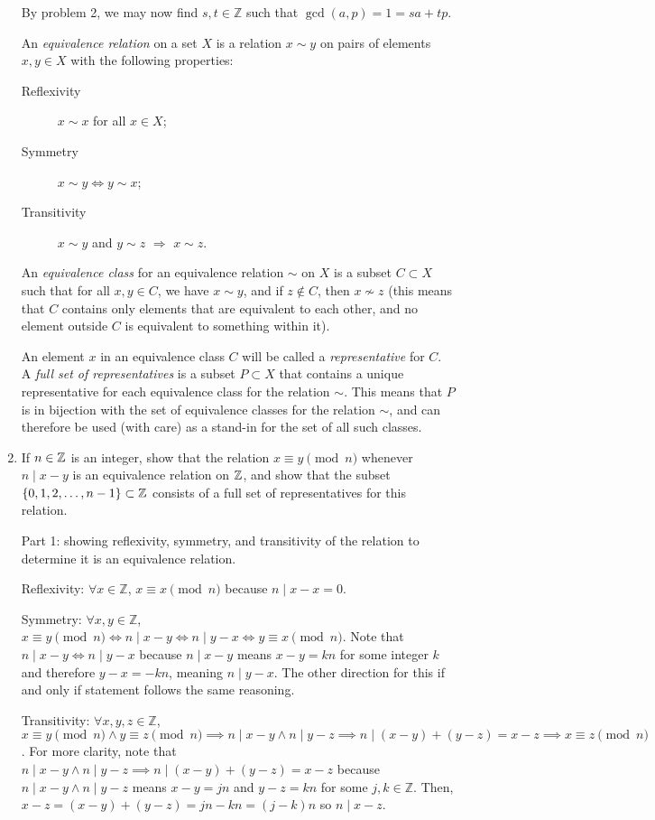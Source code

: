 \documentclass{amsart}
\begin{document}
\begin{enumerate}[itemsep=0.4in]
By problem 2, we may now find $s,t\in\mathbb Z$ such that $\gcd(a,p)=1=sa+tp$.

\vspace{0.2in}
An \emph{equivalence relation} on a set $X$ is a relation $x\sim y$ on pairs of elements $x,y\in X$ with the following properties:
\begin{description}
\item[Reflexivity] $x\sim x$ for all $x\in X$;
\item[Symmetry] $x\sim y \Leftrightarrow y\sim x$;
\item[Transitivity] $x\sim y$ and $y\sim z$ $\Rightarrow$ $x\sim z$.
\end{description}

An \emph{equivalence class} for an equivalence relation $\sim$ on $X$ is a subset $C\subset X$ such that for all $x,y\in C$, we have $x\sim y$, and if $z\notin C$, then $x\nsim z$ (this means that $C$ contains only elements that are equivalent to each other, and no element outside $C$ is equivalent to something within it).

An element $x$ in an equivalence class $C$ will be called a \emph{representative} for $C$. A \emph{full set of representatives} is a subset $P\subset X$ that contains a unique representative for each equivalence class for the relation $\sim$. This means that $P$ is in bijection with the set of equivalence classes for the relation $\sim$, and can therefore be used (with care) as a stand-in for the set of all such classes.

\item If $n\in\mathbb{Z}$ is an integer, show that the relation $x\equiv y\pmod{n}$ whenever $n\mid x-y$ is an equivalence relation on $\mathbb{Z}$, and show that the subset $\{0,1,2,\ldots,n-1\}\subset \mathbb{Z}$ consists of a full set of representatives for this relation. 

Part 1: showing reflexivity, symmetry, and transitivity of the relation to determine it is an equivalence relation. 

Reflexivity: $\forall x\in\mathbb Z$, $x\equiv x\pmod n$ because $n\mid x-x=0$. 

Symmetry: $\forall x,y\in\mathbb Z$, $x\equiv y\pmod n\iff n\mid x-y\iff n\mid y-x\iff y\equiv x\pmod n$. Note that $n\mid x-y\iff n\mid y-x$ because $n\mid x-y$ means $x-y=kn$ for some integer $k$ and therefore $y-x=-kn$, meaning $n\mid y-x$. The other direction for this if and only if statement follows the same reasoning.

Transitivity: $\forall x,y,z\in\mathbb Z$, $x\equiv y\pmod n\land y\equiv z\pmod n\implies n\mid x-y \land n\mid y-z\implies n\mid (x-y)+(y-z)=x-z\implies x\equiv z\pmod n$. For more clarity, note that $n\mid x-y \land n\mid y-z\implies n\mid (x-y)+(y-z)=x-z$ because $n\mid x-y \land n\mid y-z$ means $x-y=jn$ and $y-z=kn$ for some $j,k\in\mathbb{Z}$. Then, $x-z=(x-y)+(y-z)=jn-kn=(j-k)n$ so $n\mid x-z$.


\end{enumerate}
\end{document}
